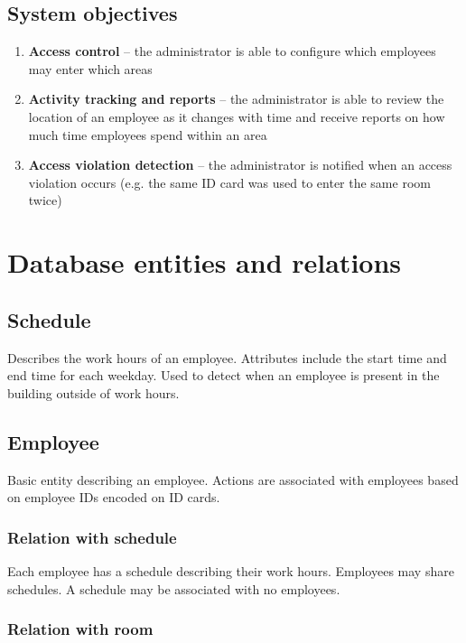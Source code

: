 \documentclass{article}
\begin{document}
	
	\subsection{System objectives}
	
	\begin{enumerate}
		\item \textbf{Access control} -- the administrator is able to configure
		which employees may enter which areas
		\item \textbf{Activity tracking and reports} -- the administrator is
		able to review the location of an employee as it changes with time and
		receive reports on how much time employees spend within an area
		\item \textbf{Access violation detection} -- the administrator is
		notified when an access violation occurs (e.g. the same ID card was
		used to enter the same room twice)
	\end{enumerate}
	
	\clearpage
	\section{Database entities and relations}
	
	\subsection{Schedule}
	
	Describes the work hours of an employee. Attributes include the start time
	and end time for each weekday. Used to detect when an employee is present
	in the building outside of work hours.
	
	\subsection{Employee}
	
	Basic entity describing an employee. Actions are associated with employees
	based on employee IDs encoded on ID cards.
	
	\subsubsection{Relation with schedule}
	
	Each employee has a schedule describing their work hours. Employees may
	share schedules. A schedule may be associated with no employees.
	
	\subsubsection{Relation with room}
	
\end{document}
